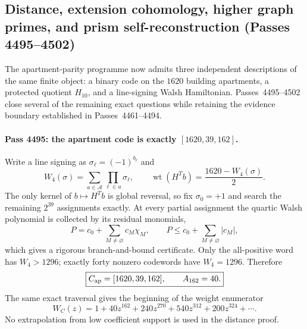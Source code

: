 \subsection{Distance, extension cohomology, higher graph primes, and prism self-reconstruction (Passes 4495--4502)}
\label{sec:pass4495-4502-apartment-distance-cohomology}

The apartment-parity programme now admits three independent descriptions of the same
finite object: a binary code on the $1620$ building apartments, a protected quotient
$H_{10}$, and a line-signing Walsh Hamiltonian.  Passes~4495--4502 close several of
the remaining exact questions while retaining the evidence boundary established in
Passes~4461--4494.

\paragraph{Pass 4495: the apartment code is exactly $[1620,39,162]$.}
Write a line signing as $\sigma_\ell=(-1)^{b_\ell}$ and
\[
  W_4(\sigma)=\sum_{a\in\mathcal A}\prod_{\ell\in a}\sigma_\ell,
  \qquad
  \operatorname{wt}(H^Tb)=\frac{1620-W_4(\sigma)}2.
\]
The only kernel of $b\mapsto H^Tb$ is global reversal, so fix
$\sigma_0=+1$ and search the remaining $2^{39}$ assignments exactly.  At every
partial assignment the quartic Walsh polynomial is collected by its residual
monomials,
\[
  P=c_0+\sum_{M\ne\varnothing}c_M\chi_M,
  \qquad
  P\le c_0+\sum_{M\ne\varnothing}|c_M|,
\]
which gives a rigorous branch-and-bound certificate.  Only the all-positive word
has $W_4>1296$; exactly forty nonzero codewords have $W_4=1296$.  Therefore
\[
  \boxed{C_{\rm ap}=[1620,39,162],\qquad A_{162}=40.}
\]
The same exact traversal gives the beginning of the weight enumerator
\[
  \boxed{W_C(z)=1+40z^{162}+240z^{270}+540z^{312}+200z^{324}+\cdots.}
\]
No extrapolation from low coefficient support is used in the distance proof.

